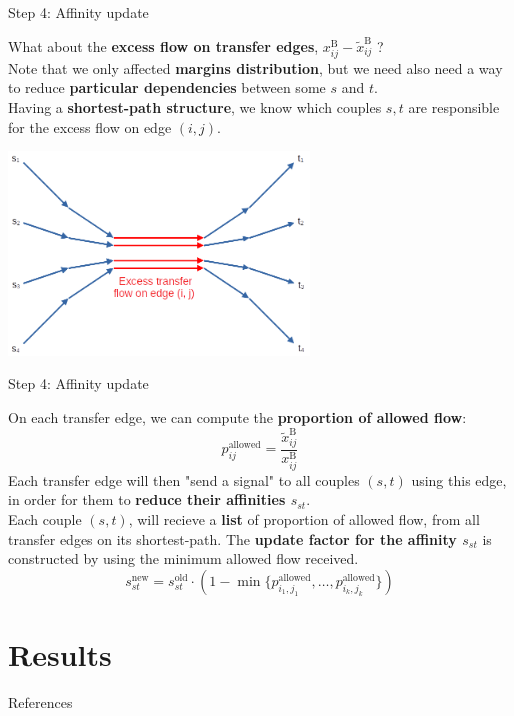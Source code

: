 \documentclass[10pt]{beamer}
\newcommand{\imp}[1]{\textbf{\color{cyan}#1}}
\begin{document}
	
	\begin{frame}{Step 4: Affinity update}
		
		What about the \imp{excess flow on transfer edges}, $x^\text{B}_{ij} - \widetilde{x}^\text{B}_{ij}$ ? \\
		\vspace{0.4cm}
		Note that we only affected \imp{margins distribution}, but we need also need a way to reduce \imp{particular dependencies} between some $s$ and $t$. \\
		\vspace{0.4cm}
		Having a \imp{shortest-path structure}, we know which couples $s, t$ are responsible for the excess flow on edge $(i, j)$.
		\begin{center}
			\includegraphics[width=0.6\textwidth]{img/excess_flow.png}
		\end{center}
	\end{frame}
	
	
	\begin{frame}{Step 4: Affinity update}
		
		On each transfer edge, we can compute the \imp{proportion of allowed flow}:
		$$
			p^\text{allowed}_{ij} = \frac{\widetilde{x}_{ij}^\text{B}}{x_{ij}^\text{B}}
		$$
		Each transfer edge will then "send a signal" to all couples $(s,t)$ using this edge, in order for them to \imp{reduce their affinities $s_{st}$}. \\
		\vspace{0.4cm}
		Each couple $(s,t)$, will recieve a \imp{list} of proportion of allowed flow, from all transfer edges on its shortest-path. The \imp{update factor for the affinity $s_{st}$} is constructed by using the minimum allowed flow received.
		$$
			s^\text{new}_{st} = s^\text{old}_{st} \cdot (1 - \min\{p^\text{allowed}_{i_1, j_1}, \ldots, p^\text{allowed}_{i_k, j_k} \})
		$$
	\end{frame}
	
	
	\section{Results}
	
	
	
	\begin{frame}[allowframebreaks]{References}
		
		
		
		
	\end{frame}
	
\end{document}
